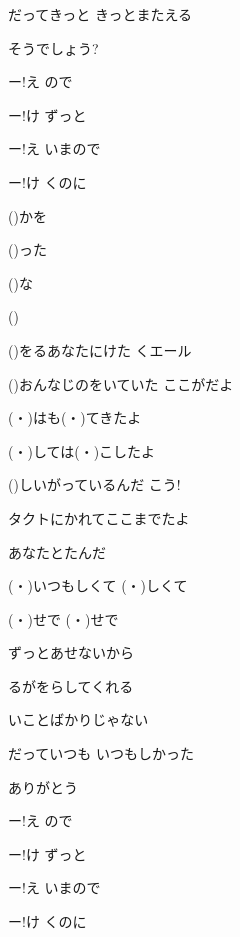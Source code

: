 \documentclass[14pt]{ltjsarticle}
\begin{document}
{  だってきっと きっとまたえる
  \jisho{}

  そうでしょう?
  \jisho{}

\item
  ー!え ので
  \jisho{}

  ー!け ずっと
  \jisho{}

  ー!え いまので
  \jisho{}

  ー!け くのに
  \jisho{}

\item
  ()かを
  \jisho{}

  ()った
  \jisho{}

  ()な
  \jisho{}

  ()
  \jisho{}

  ()をるあなたにけた くエール
  \jisho{}

\item
  ()おんなじのをいていた ここがだよ
  \jisho{}

  (・)はも(・)てきたよ
  \jisho{}

  (・)しては(・)こしたよ
  \jisho{}

  ()しいがっているんだ こう!
  \jisho{}

\item
  タクトにかれてここまでたよ
  \jisho{}

  あなたとたんだ
  \jisho{}

  (・)いつもしくて (・)しくて
  \jisho{}

  (・)せで (・)せで
  \jisho{}

  ずっとあせないから
  \jisho{}

  るがをらしてくれる
  \jisho{}

  いことばかりじゃない
  \jisho{}

  だっていつも いつもしかった
  \jisho{}

  ありがとう
  \jisho{}

\item
  ー!え ので
  \jisho{}

  ー!け ずっと
  \jisho{}

  ー!え いまので
  \jisho{}

  ー!け くのに
  \jisho{}
}
\end{document}
